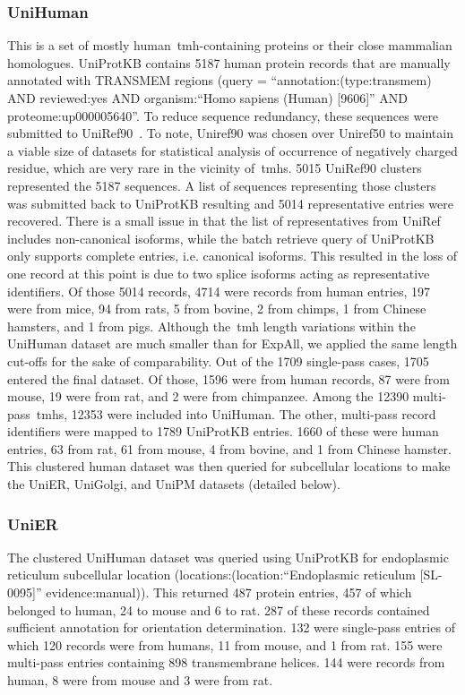 \subsubsection{UniHuman}
This is a set of mostly human~\gls{tmh}-containing proteins or their close mammalian homologues.
UniProtKB contains 5187 human protein records that are manually annotated with TRANSMEM regions (query = ``annotation:(type:transmem) AND reviewed:yes AND organism:``Homo sapiens (Human) [9606]'' AND proteome:up000005640''.
To reduce sequence redundancy, these sequences were submitted to UniRef90~\cite{Suzek2015}.
To note, Uniref90 was chosen over Uniref50 to maintain a viable size of datasets for statistical analysis of occurrence of negatively charged residue, which are very rare in the vicinity of~\gls{tmh}s.
5015 UniRef90 clusters represented the 5187 sequences.
A list of sequences representing those clusters was submitted back to UniProtKB resulting and 5014 representative entries were recovered.
There is a small issue in that the list of representatives from UniRef includes non-canonical isoforms, while the batch retrieve query of UniProtKB only supports complete entries, i.e.
canonical isoforms.
This resulted in the loss of one record at this point is due to two splice isoforms acting as representative identifiers.
Of those 5014 records, 4714 were records from human entries, 197 were from mice, 94 from rats, 5 from bovine, 2 from chimps, 1 from Chinese hamsters, and 1 from pigs.
Although the~\gls{tmh} length variations within the UniHuman dataset are much smaller than for ExpAll, we applied the same length cut-offs for the sake of comparability.
Out of the 1709 single-pass cases, 1705 entered the final dataset.
Of those, 1596 were from human records, 87 were from mouse, 19 were from rat, and 2 were from chimpanzee.
Among the 12390 multi-pass~\gls{tmh}s, 12353 were included into UniHuman.
The other, multi-pass record identifiers were mapped to 1789 UniProtKB entries.
1660 of these were human entries, 63 from rat, 61 from mouse, 4 from bovine, and 1 from Chinese hamster.
This clustered human dataset was then queried for subcellular locations to make the UniER, UniGolgi, and UniPM datasets (detailed below).

\subsubsection{UniER}
The clustered UniHuman dataset was queried using UniProtKB for endoplasmic reticulum subcellular location (locations:(location:``Endoplasmic reticulum [SL-0095]'' evidence:manual)).
This returned 487 protein entries, 457 of which belonged to human, 24 to mouse and 6 to rat.
287 of these records contained sufficient annotation for orientation determination.
132 were single-pass entries of which 120 records were from humans, 11 from mouse, and 1 from rat.
155 were multi-pass entries containing 898 transmembrane helices.
144 were records from human, 8 were from mouse and 3 were from rat.

